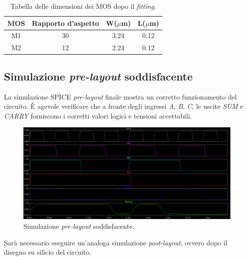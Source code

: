 \begin{table}[htb]
	\centering
	\begin{tabular}{c*{3}{c}}
		\toprule
		MOS & Rapporto d'aspetto & W($\mu$m) & L($\mu$m)\\
		\midrule
		M1 & 30 & 3.24 & 0.12\\
		M2 & 12 & 2.24 & 0.12\\
		\bottomrule
	\end{tabular}
	\caption{Tabella delle dimensioni dei MOS dopo il \textit{fitting}.}
	\label{tab:dimensioniMosDefinitive}
\end{table}

\subsection{Simulazione \textit{pre-layout} soddisfacente}
La simulazione SPICE \textit{pre-layout} finale mostra un corretto funzionamento del circuito. \MakeUppercase{è} agevole verificare che a fronte degli ingressi \textit{A}, \textit{B}, \textit{C}, le uscite \textit{SUM} e \textit{CARRY} forniscono i corretti valori logici e tensioni accettabili.

\begin{figure}[hbt!]
	\centering
	\includegraphics[width=1\textwidth]{figure/sim_FA_Good.png}
	\caption{Simulazione \textit{pre-layout} soddisfacente.}
	\label{fig:simulazionePreLayoutSoddisfacente}
\end{figure}

Sarà necessario eseguire un'analoga simulazione \textit{post-layout}, ovvero dopo il disegno su silicio del circuito.




